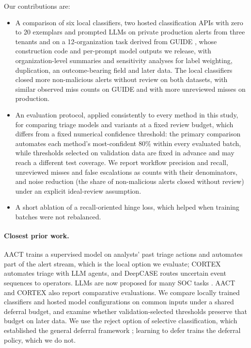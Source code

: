 \documentclass[letterpaper]{article} %
\begin{document}
Our contributions are:

\begin{itemize}
    \item A comparison of six local classifiers, two hosted classification APIs with zero to 20 exemplars and prompted LLMs on private production alerts from three tenants and on a 12-organization task derived from GUIDE \citep{guide2024}, whose construction code and per-prompt model outputs we release, with organization-level summaries and sensitivity analyses for label weighting, duplication, an outcome-bearing field and later data. The local classifiers closed more non-malicious alerts without review on both datasets, with similar observed miss counts on GUIDE and with more unreviewed misses on production.
    \item An evaluation protocol, applied consistently to every method in this study, for comparing triage models and variants at a fixed review budget, which differs from a fixed numerical confidence threshold: the primary comparison automates each method's most-confident 80\% within every evaluated batch, while thresholds selected on validation data are fixed in advance and may reach a different test coverage. We report workflow precision and recall, unreviewed misses and false escalations as counts with their denominators, and noise reduction (the share of non-malicious alerts closed without review) under an explicit ideal-review assumption.
    \item A short ablation of a recall-oriented hinge loss, which helped when training batches were not rebalanced.
\end{itemize}

\paragraph{Closest prior work.} AACT \citep{turcotte2025aact} trains a supervised model on analysts' past triage actions and automates part of the alert stream, which is the local option we evaluate; CORTEX \citep{wei2025cortex} automates triage with LLM agents, and DeepCASE \citep{vanede2022deepcase} routes uncertain event sequences to operators. LLMs are now proposed for many SOC tasks \citep{habibzadeh2026survey,singh2026llms}. AACT and CORTEX also report comparative evaluations. We compare locally trained classifiers and hosted model configurations on common inputs under a shared deferral budget, and examine whether validation-selected thresholds preserve that budget on later data. We use the reject option of selective classification, which established the general deferral framework \citep{chow1970reject,geifman2017selective}; learning to defer \citep{mozannar2020defer} trains the deferral policy, which we do not. 
\end{document}

